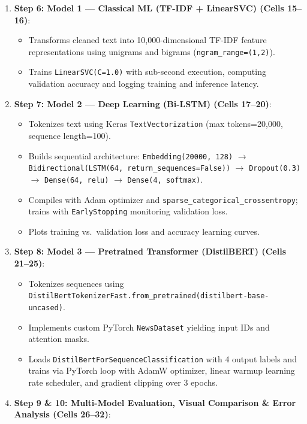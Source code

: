 \documentclass[12pt,a4paper,oneside]{report}
\providecommand{\tightlist}{\setlength{\itemsep}{0pt}\setlength{\parskip}{0pt}}
\begin{document}
\begin{enumerate}
  \begin{itemize}
  \tightlist
  \item
    Defines \texttt{clean\_text()}: strips HTML artifacts, removes web URLs, removes special punctuation, and normalizes whitespaces.
  \item
    Executes an 80\% Train, 10\% Validation, and 10\% Test stratified split using \texttt{train\_test\_split(...,\ stratify=y)}.
  \end{itemize}
\item
  \textbf{Step 6: Model 1 --- Classical ML (TF-IDF + LinearSVC) (Cells 15--16)}:

  \begin{itemize}
  \tightlist
  \item
    Transforms cleaned text into 10,000-dimensional TF-IDF feature representations using unigrams and bigrams (\texttt{ngram\_range=(1,2)}).
  \item
    Trains \texttt{LinearSVC(C=1.0)} with sub-second execution, computing validation accuracy and logging training and inference latency.
  \end{itemize}
\item
  \textbf{Step 7: Model 2 --- Deep Learning (Bi-LSTM) (Cells 17--20)}:

  \begin{itemize}
  \tightlist
  \item
    Tokenizes text using Keras \texttt{TextVectorization} (max tokens=20,000, sequence length=100).
  \item
    Builds sequential architecture: \texttt{Embedding(20000,\ 128)} \(\rightarrow\) \texttt{Bidirectional(LSTM(64,\ return\_sequences=False))} \(\rightarrow\) \texttt{Dropout(0.3)} \(\rightarrow\) \texttt{Dense(64,\ relu)} \(\rightarrow\) \texttt{Dense(4,\ softmax)}.
  \item
    Compiles with Adam optimizer and \texttt{sparse\_categorical\_crossentropy}; trains with \texttt{EarlyStopping} monitoring validation loss.
  \item
    Plots training vs.~validation loss and accuracy learning curves.
  \end{itemize}
\item
  \textbf{Step 8: Model 3 --- Pretrained Transformer (DistilBERT) (Cells 21--25)}:

  \begin{itemize}
  \tightlist
  \item
    Tokenizes sequences using \texttt{DistilBertTokenizerFast.from\_pretrained(\textquotesingle{}distilbert-base-uncased\textquotesingle{})}.
  \item
    Implements custom PyTorch \texttt{NewsDataset} yielding input IDs and attention masks.
  \item
    Loads \texttt{DistilBertForSequenceClassification} with 4 output labels and trains via PyTorch loop with AdamW optimizer, linear warmup learning rate scheduler, and gradient clipping over 3 epochs.
  \end{itemize}
\item
  \textbf{Step 9 \& 10: Multi-Model Evaluation, Visual Comparison \& Error Analysis (Cells 26--32)}:


\end{enumerate}
\end{document}
